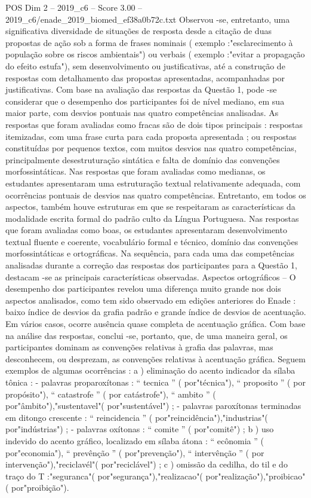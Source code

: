 \begin{textsample}{POS Dim 2 – 2019\_c6 – Score 3.00 – 2019\_c6/enade\_2019\_biomed\_ef38a0b72c.txt}
Observou -se, entretanto, uma significativa diversidade de situações de resposta desde a citação de duas propostas de ação sob a forma de frases nominais ( exemplo :"esclarecimento à população sobre os riscos ambientais") ou verbais ( exemplo :"evitar a propagação do efeito estufa"), sem desenvolvimento ou justificativas, até a construção de respostas com detalhamento das propostas apresentadas, acompanhadas por justificativas.
Com base na avaliação das respostas da Questão 1, pode -se considerar que o desempenho dos participantes foi de nível mediano, em sua maior parte, com desvios pontuais nas quatro competências analisadas.
As respostas que foram avaliadas como fracas são de dois tipos principais : respostas itemizadas, com uma frase curta para cada proposta apresentada ; ou respostas constituídas por pequenos textos, com muitos desvios nas quatro competências, principalmente desestruturação sintática e falta de domínio das convenções morfossintáticas.
Nas respostas que foram avaliadas como medianas, os estudantes apresentaram uma estruturação textual relativamente adequada, com ocorrências pontuais de desvios nas quatro competências.
Entretanto, em todos os aspectos, também houve estruturas em que se respeitaram as características da modalidade escrita formal do padrão culto da Língua Portuguesa.
Nas respostas que foram avaliadas como boas, os estudantes apresentaram desenvolvimento textual fluente e coerente, vocabulário formal e técnico, domínio das convenções morfossintáticas e ortográficas.
Na sequência, para cada uma das competências analisadas durante a correção das respostas dos participantes para a Questão 1, destacam -se as principais características observadas.
Aspectos ortográficos – O desempenho dos participantes revelou uma diferença muito grande nos dois aspectos analisados, como tem sido observado em edições anteriores do Enade : baixo índice de desvios da grafia padrão e grande índice de desvios de acentuação.
Em vários casos, ocorre ausência quase completa de acentuação gráfica.
Com base na análise das respostas, conclui -se, portanto, que, de uma maneira geral, os participantes dominam as convenções relativas à grafia das palavras, mas desconhecem, ou desprezam, as convenções relativas à acentuação gráfica.
Seguem exemplos de algumas ocorrências : a ) eliminação do acento indicador da sílaba tônica : - palavras proparoxítonas : “ tecnica ” ( por"técnica"), “ proposito ” ( por propósito"), “ catastrofe ” ( por catástrofe"), “ ambito ” ( por"âmbito"),"sustentavel"( por"sustentável") ; - palavras paroxítonas terminadas em ditongo crescente : “ reincidencia ” ( por"reincidência"),"industrias"( por"indústrias") ; - palavras oxítonas : “ comite ” ( por"comitê") ; b ) uso indevido do acento gráfico, localizado em sílaba átona : “ ecônomia ” ( por"economia"), “ prevênção ” ( por"prevenção"), “ intervênção ” ( por intervenção"),"reciclavél"( por"reciclável") ; c ) omissão da cedilha, do til e do traço do T :"seguranca"( por"segurança"),"realizacao"( por"realização"),"proibicao"( por"proibição").

\end{textsample}
